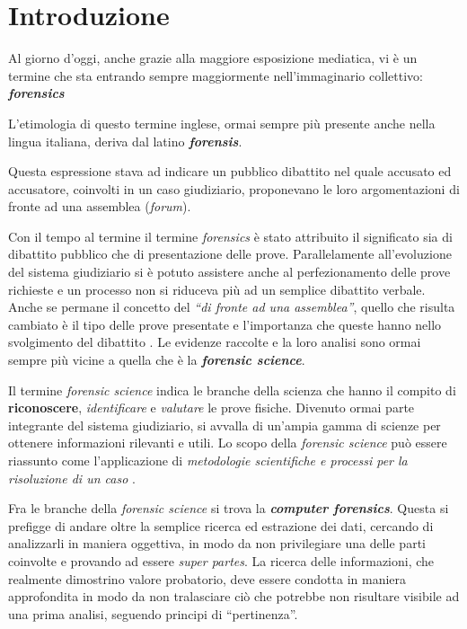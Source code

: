 
\chapter{Introduzione}

Al giorno d'oggi, anche grazie alla maggiore esposizione mediatica, vi è un termine che sta entrando sempre maggiormente nell'immaginario collettivo: \textit{\textbf{forensics}}

L'etimologia di questo termine inglese, ormai sempre più presente anche nella lingua italiana, deriva dal latino \textbf{\textit{forensis}}. 

Questa espressione stava ad indicare un pubblico dibattito nel quale accusato ed accusatore, coinvolti in un caso giudiziario, proponevano le loro argomentazioni di fronte ad una assemblea (\textit{forum}). 

Con il tempo al termine il termine \textit{forensics} è stato attribuito il significato sia di dibattito pubblico che di presentazione delle prove. Parallelamente all'evoluzione del sistema giudiziario si è potuto assistere anche al perfezionamento delle prove richieste e un processo non si riduceva più ad un semplice dibattito verbale. Anche se permane il concetto del \textit{``di fronte ad una assemblea''}, quello che risulta cambiato è il tipo delle prove presentate e l'importanza che queste hanno nello svolgimento del dibattito \cite{Noctis}. Le evidenze raccolte e la loro analisi sono ormai sempre più vicine a quella che è la \textbf{\textit{forensic science}}. 

Il termine \textit{forensic science} indica le branche della scienza che hanno il compito di \textbf{riconoscere}, \textit{identificare} e \textit{valutare} le prove fisiche. Divenuto ormai parte integrante del sistema giudiziario, si avvalla di un'ampia gamma di scienze per ottenere informazioni rilevanti e utili. Lo scopo della \textit{forensic science} può essere riassunto come l'applicazione di \textit{metodologie scientifiche e processi per la risoluzione di un caso} \cite{Forensics}.

Fra le branche della \textit{forensic science} si trova la \textbf{\textit{computer forensics}}. Questa si prefigge di andare oltre la semplice ricerca ed estrazione dei dati, cercando di analizzarli in maniera oggettiva, in modo da non privilegiare una delle parti coinvolte e provando ad essere \textit{super partes}. La ricerca delle informazioni, che realmente dimostrino valore probatorio, deve essere condotta in maniera approfondita in modo da non tralasciare ciò che potrebbe non risultare visibile ad una prima analisi, seguendo principi di ``pertinenza''.

